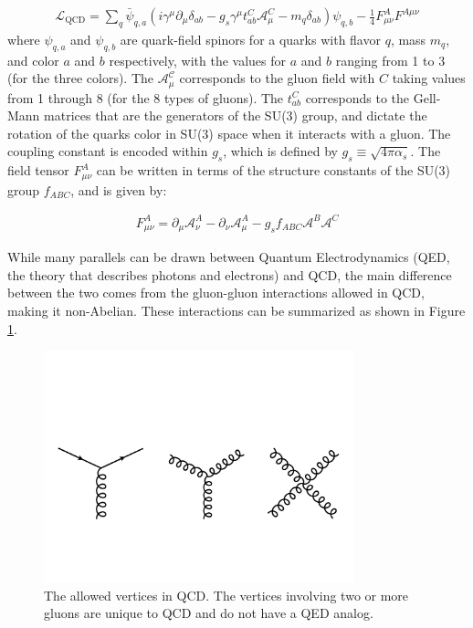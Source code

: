 \begin{align}
\mathcal{{L}}_{\mathrm{QCD}} = \sum_q \bar{\psi}_{q,a} (i \gamma^\mu \partial_\mu \delta_{ab} - g_s \gamma^\mu t_{ab}^C \mathcal{A}_\mu^C - m_q \delta_{ab}) \psi_{q,b} - \frac{1}{4} F_{\mu\nu}^A F^{A \mu\nu}
\end{align}
where $\psi_{q,a}$ and $\psi_{q,b}$ are quark-field spinors for a quarks with flavor $q$, mass $m_q$, and color $a$ and $b$ respectively, with
the values for $a$ and $b$ ranging  from 1 to 3 (for the three colors). The $\mathcal{A_\mu^C}$ corresponds to the gluon field with $C$ taking 
values from 1 through 8 (for the 8 types of gluons). The $t_{ab}^C$ corresponds to the Gell-Mann matrices that are the generators of the 
SU(3) group, and dictate the rotation of the quarks color in SU(3) space when it interacts with a gluon. The coupling constant is encoded
within $g_s$, which is defined by $g_s \equiv \sqrt{4 \pi \alpha_s}$. The field tensor $F_{\mu\nu}^A$ can be written in terms of the structure
constants of the SU(3) group $f_{ABC}$, and is given by:

\begin{align}
F_{\mu\nu}^A = \partial_\mu \mathcal{A}_\nu^A - \partial_\nu \mathcal{A}_\mu^A - g_s f_{ABC} \mathcal{A}^B \mathcal{A}^C
\end{align}

While many parallels can be drawn between Quantum Electrodynamics (QED, the theory that describes photons and electrons) and 
QCD, the main difference between the two comes from the gluon-gluon interactions allowed in QCD, making it non-Abelian. These
interactions can be summarized as shown in Figure \ref{fig:qcd_diagrams}.

\begin{figure}[htbp]
\begin{center}
\includegraphics[width=0.8\textwidth]{figures/theory/qcd_diagrams}
\caption{The allowed vertices in QCD. The vertices involving two or more gluons are unique to QCD and do not have a QED analog. }
\label{fig:qcd_diagrams}
\end{center}
\end{figure}

